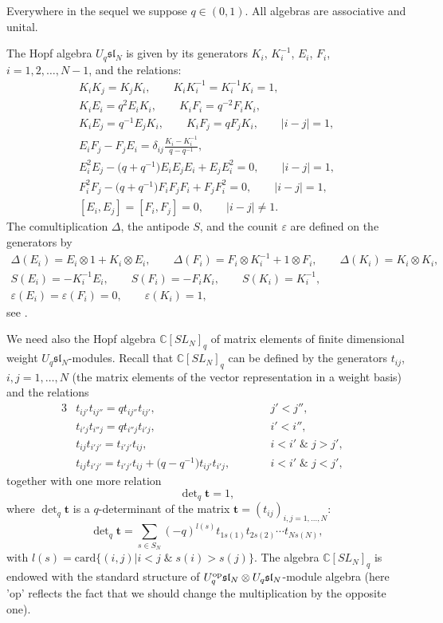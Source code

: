 \documentclass[pdftex]{sigma}
\begin{document}
Everywhere in the sequel we suppose $q\in(0,1)$. All algebras are associative and unital.

The Hopf algebra $U_q\mathfrak{sl}_{N}$ is given by its generators $K_i$, $K_i^{-1}$, $E_i$, $F_i$,
$i=1,2,\ldots,N-1$, and the relations:
\begin{gather*}
K_iK_j=K_jK_i,\qquad K_iK_i^{-1}=K_i^{-1}K_i=1,
\\
K_iE_i=q^2E_iK_i,\qquad K_iF_i=q^{-2}F_iK_i,
\\
K_iE_j=q^{-1}E_jK_i,\qquad K_iF_j=q F_jK_i, \qquad |i-j|=1,
\\
E_iF_j-F_jE_i=\delta_{ij}\frac{K_i-K_i^{-1}}{q-q^{-1}},
\\
E_i^2E_j-\big(q+q^{-1}\big)E_iE_jE_i+E_jE_i^2=0,\qquad|i-j|=1,
\\
F_i^2F_j-\big(q+q^{-1}\big)F_iF_jF_i+F_jF_i^2=0,\qquad|i-j|=1,
\\
[E_i,E_j]=[F_i,F_j]=0,\qquad|i-j|\ne 1.
\end{gather*}
 The comultiplication $\Delta$, the antipode $S$, and the counit
$\varepsilon$ are def\/ined on the generators by
\begin{gather*}
\Delta(E_i)=E_i\otimes 1+K_i\otimes E_i,\qquad \Delta(F_i)=F_i\otimes K_i^{-1}+1\otimes F_i,\qquad
\Delta(K_i)=K_i\otimes K_i,
\\
S(E_i)=-K_i^{-1}E_i,\qquad S(F_i)=-F_iK_i,\qquad S(K_i)=K_i^{-1},
\\
\varepsilon(E_i)=\varepsilon(F_i)=0,\qquad\varepsilon(K_i)=1,
\end{gather*} see \cite[Chapter 4]{Jant}.

We need also the Hopf algebra $\mathbb{C}[SL_{N}]_q$ of matrix elements of f\/inite dimensional weight
$U_q\mathfrak{sl}_{N}$-modules. Recall that $\mathbb{C}[SL_{N}]_q$ can be def\/ined by the generators $t_{ij}$,
$i,j=1,\dots,N$ (the matrix elements of the vector representation in a weight basis) and the relations
\begin{alignat*}{3}
&t_{ij'}t_{ij''}=qt_{ij''}t_{ij'},\qquad && j'<j'',&
\\ &t_{i'j}t_{i''j}=qt_{i''j}t_{i'j},\qquad && i'<i'',&
\\ &t_{ij}t_{i'j'}=t_{i'j'}t_{ij},\qquad && i<i'\;\&\;j>j', &
\\ &t_{ij}t_{i'j'}=t_{i'j'}t_{ij}+\big(q-q^{-1}\big)t_{ij'}t_{i'j},\qquad
&& i<i'\;\&\; j<j',&
\end{alignat*}
together with one more relation
\[
\det\nolimits_q\mathbf{t}=1,
\]
where $\det\nolimits_q\mathbf{t}$ is a $q$-determinant of the matrix $\mathbf{t}=(t_{ij})_{i,j=1,\dots,N}$:
\[
\det\nolimits_q\mathbf{t}=\sum\limits_{s\in S_{N}}(-q)^{l(s)}t_{1 s(1)} t_{2s(2)}\cdots t_{Ns(N)},
\]
with $l(s)=\mathrm{card}\{(i,j)|i<j\;\&\;s(i)>s(j)\}$. The algebra $\mathbb C[SL_N]_q$ is endowed with the
standard structure of $U_q^{\rm op}\mathfrak{sl}_N \otimes U_q \mathfrak{sl}_N$-module algebra (here 'op'
ref\/lects the fact that we should change the multiplication by the opposite one).
\end{document}
